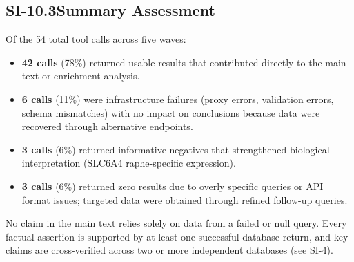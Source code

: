 \subsection*{SI-10.3\quad Summary Assessment}

Of the 54 total tool calls across five waves:

\begin{itemize}[nosep]
  \item \textbf{42 calls} (78\%) returned usable results that contributed
        directly to the main text or enrichment analysis.
  \item \textbf{6 calls} (11\%) were infrastructure failures (proxy errors,
        validation errors, schema mismatches) with no impact on conclusions
        because data were recovered through alternative endpoints.
  \item \textbf{3 calls} (6\%) returned informative negatives that
        strengthened biological interpretation (SLC6A4 raphe-specific
        expression).
  \item \textbf{3 calls} (6\%) returned zero results due to overly specific
        queries or API format issues; targeted data were obtained through
        refined follow-up queries.
\end{itemize}

\noindent
No claim in the main text relies solely on data from a failed or null query.
Every factual assertion is supported by at least one successful database
return, and key claims are cross-verified across two or more independent
databases (see SI-4).